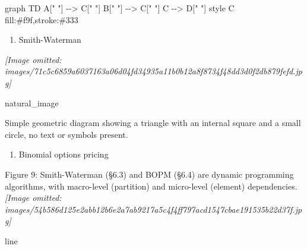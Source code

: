 \documentclass[
]{article}
\newenvironment{Shaded}{}{}
\newcommand{\NormalTok}[1]{#1}
\providecommand{\tightlist}{%
  \setlength{\itemsep}{0pt}\setlength{\parskip}{0pt}}
\begin{document}
\begin{Shaded}
\begin{Highlighting}[]
\NormalTok{graph TD}
\NormalTok{    A[" "] {-}{-}\textgreater{} C[" "]}
\NormalTok{    B[" "] {-}{-}\textgreater{} C[" "]}
\NormalTok{    C {-}{-}\textgreater{} D[" "]}
\NormalTok{    style C fill:\#f9f,stroke:\#333}
\end{Highlighting}
\end{Shaded}

\begin{enumerate}
\def\labelenumi{(\alph{enumi})}
\tightlist
\item
  Smith-Waterman
\end{enumerate}

\textit{[Image omitted: images/71c5c6859a6037163a06d04fd34935a11b0b12a8f8734f48dd3d0f2db879fefd.jpg]}

natural\_image

Simple geometric diagram showing a triangle with an internal square and
a small circle, no text or symbols present.

\begin{enumerate}
\def\labelenumi{(\alph{enumi})}
\setcounter{enumi}{1}
\tightlist
\item
  Binomial options pricing
\end{enumerate}

Figure 9: Smith-Waterman (§6.3) and BOPM (§6.4) are dynamic programming
algorithms, with macro-level (partition) and micro-level (element)
dependencies.\\
\textit{[Image omitted: images/54b586d125e2abb12b6e2a7ab9217a5c4f4ff797acd1547cbae191535b22d37f.jpg]}

line
\end{document}

